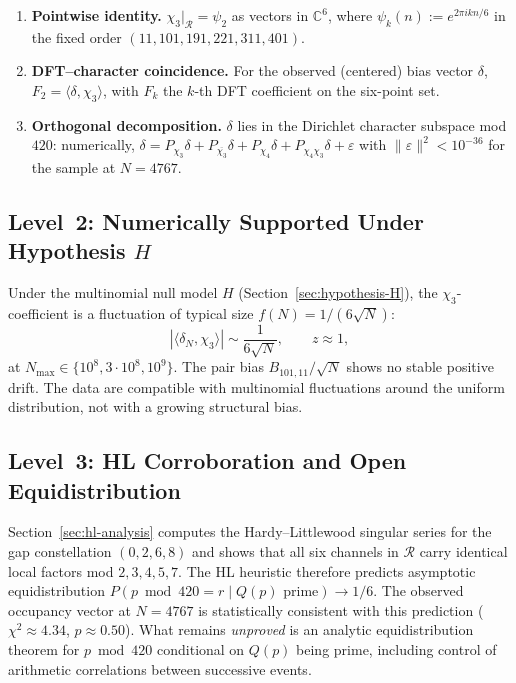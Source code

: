 \documentclass[11pt,a4paper]{article}
\newcommand{\R}{\mathcal{R}}
\begin{document}
\begin{enumerate}
  \item \textbf{Pointwise identity.}
        $\chi_3|_{\R}=\psi_2$ as vectors in $\mathbb{C}^6$, where
        $\psi_k(n):=e^{2\pi i kn/6}$ in the fixed order
        $(11,101,191,221,311,401)$.
  \item \textbf{DFT--character coincidence.}
        For the observed (centered) bias vector $\delta$,
        $F_2=\langle\delta,\chi_3\rangle$, with $F_k$ the $k$-th DFT
        coefficient on the six-point set.
  \item \textbf{Orthogonal decomposition.}
        $\delta$ lies in the Dirichlet character subspace mod $420$:
        numerically,
        $\delta = P_{\chi_3}\delta + P_{\overline{\chi_3}}\delta
        + P_{\chi_4}\delta + P_{\chi_4\chi_3}\delta + \varepsilon$
        with $\|\varepsilon\|^2 < 10^{-36}$ for the sample at $N=4767$.
\end{enumerate}

\subsection{Level~2: Numerically Supported Under Hypothesis $H$}

Under the multinomial null model $H$ (Section~\ref{sec:hypothesis-H}),
the $\chi_3$-coefficient is a fluctuation of typical size
$f(N)=1/(6\sqrt{N})$:
\[
  |\langle\delta_N,\chi_3\rangle| \sim \frac{1}{6\sqrt{N}},
  \qquad z \approx 1,
\]
at $N_{\max}\in\{10^8,3\cdot 10^8,10^9\}$.
The pair bias $B_{101,11}/\sqrt{N}$ shows no stable positive drift.
The data are compatible with multinomial fluctuations around the uniform
distribution, not with a growing structural bias.

\subsection{Level~3: HL Corroboration and Open Equidistribution}

Section~\ref{sec:hl-analysis} computes the Hardy--Littlewood singular
series for the gap constellation $(0,2,6,8)$ and shows that all six
channels in $\R$ carry identical local factors mod $2,3,4,5,7$.
The HL heuristic therefore predicts asymptotic equidistribution
$P(p\bmod 420=r\mid Q(p)\text{ prime})\to 1/6$.
The observed occupancy vector at $N=4767$ is statistically consistent
with this prediction ($\chi^2\approx 4.34$, $p\approx 0.50$).
What remains \emph{unproved} is an analytic equidistribution theorem
for $p\bmod 420$ conditional on $Q(p)$ being prime, including control
of arithmetic correlations between successive events.
\end{document}
